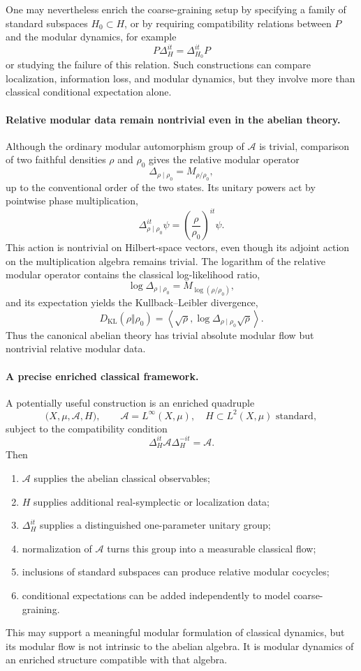\documentclass[a4paper,11pt]{article}
\theoremstyle{definition}
\begin{document}
One may nevertheless enrich the coarse-graining setup by specifying a family of standard subspaces \(H_0\subset H\), or by requiring compatibility relations between \(P\) and the modular dynamics, for example
\[
    P\Delta_H^{it}=\Delta_{H_0}^{it}P
\]
or studying the failure of this relation. Such constructions can compare localization, information loss, and modular dynamics, but they involve more than classical conditional expectation alone.

\paragraph{Relative modular data remain nontrivial even in the abelian theory.}
Although the ordinary modular automorphism group of \(\mathcal{A}\) is trivial, comparison of two faithful densities \(\rho\) and \(\rho_0\) gives the relative modular operator
\[
    \Delta_{\rho\mid\rho_0}=M_{\rho/\rho_0},
\]
up to the conventional order of the two states. Its unitary powers act by pointwise phase multiplication,
\[
    \Delta_{\rho\mid\rho_0}^{it}\psi
    =\left(\frac{\rho}{\rho_0}\right)^{it}\psi.
\]
This action is nontrivial on Hilbert-space vectors, even though its adjoint action on the multiplication algebra remains trivial. The logarithm of the relative modular operator contains the classical log-likelihood ratio,
\[
    \log\Delta_{\rho\mid\rho_0}
    =M_{\log(\rho/\rho_0)},
\]
and its expectation yields the Kullback--Leibler divergence,
\[
    D_{\mathrm{KL}}(\rho\Vert\rho_0)
    =\left\langle\sqrt\rho,
    \log\Delta_{\rho\mid\rho_0}\sqrt\rho\right\rangle.
\]
Thus the canonical abelian theory has trivial absolute modular flow but nontrivial relative modular data.

\paragraph{A precise enriched classical framework.}
A potentially useful construction is an enriched quadruple
\[
    \bigl(X,\mu,\mathcal{A},H\bigr),
    \qquad
    \mathcal{A}=L^\infty(X,\mu),
    \quad
    H\subset L^2(X,\mu)
    \text{ standard},
\]
subject to the compatibility condition
\[
    \Delta_H^{it}\mathcal{A}\Delta_H^{-it}=\mathcal{A}.
\]
Then
\begin{enumerate}
    \item \(\mathcal{A}\) supplies the abelian classical observables;
    \item \(H\) supplies additional real-symplectic or localization data;
    \item \(\Delta_H^{it}\) supplies a distinguished one-parameter unitary group;
    \item normalization of \(\mathcal{A}\) turns this group into a measurable classical flow;
    \item inclusions of standard subspaces can produce relative modular cocycles;
    \item conditional expectations can be added independently to model coarse-graining.
\end{enumerate}
This may support a meaningful modular formulation of classical dynamics, but its modular flow is not intrinsic to the abelian algebra. It is modular dynamics of an enriched structure compatible with that algebra.
\end{document}
